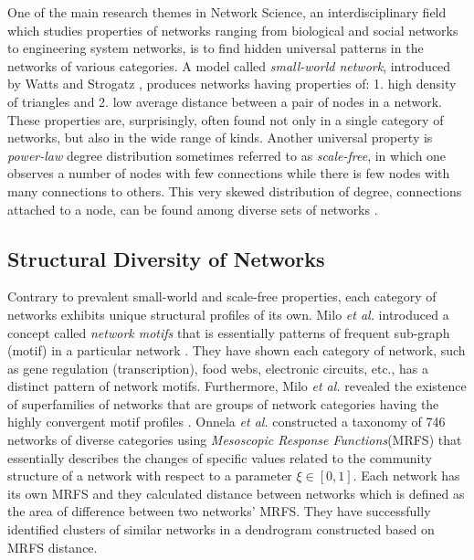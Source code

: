 \documentclass{article}
\begin{document}
	One of the main research themes in Network Science, an interdisciplinary field which studies properties of networks ranging from biological and social networks to engineering system networks, is to find hidden universal patterns in the networks of various categories. A model called \textit{small-world network}, introduced by Watts and Strogatz \cite{watts1998cds}, produces networks having properties of: 1. high density of triangles and 2. low average distance between a pair of nodes in a network. These properties are, surprisingly, often found not only in a single category of networks, but also in the wide range of kinds. Another universal property is \textit{power-law} degree distribution sometimes referred to as \textit{scale-free}, in which one observes a number of nodes with few connections while there is few nodes with many connections to others. This very skewed distribution of degree, connections attached to a node, can be found among diverse sets of networks \cite{Barabasi99emergenceScaling}. 


	\subsection{Structural Diversity of Networks}
	Contrary to prevalent small-world and scale-free properties, each category of networks exhibits unique structural profiles of its own. Milo \textit{et al.} introduced a concept called \textit{network motifs} that is essentially patterns of frequent  sub-graph (motif) in a particular network \cite{Milo_motif}. They have shown each category of network, such as gene regulation (transcription), food webs, electronic circuits, etc., has a distinct pattern of network motifs. Furthermore, Milo \textit{et al.} revealed the existence of superfamilies of networks that  are groups of network categories having the highly convergent motif profiles \cite{Milo_SuperFamily}. Onnela \textit{et al.} constructed a taxonomy of 746 networks  of diverse categories using \textit{Mesoscopic Response Functions}(MRFS) that essentially describes the changes of specific values related to the community structure of a network with respect to a parameter $\xi \in [0,1]$\cite{Onnela_Taxonomy}. Each network has its own MRFS and they calculated distance between networks which is defined as the area of difference between two networks' MRFS. They have successfully identified clusters of similar networks in a dendrogram constructed based on MRFS distance.
	
\end{document}
